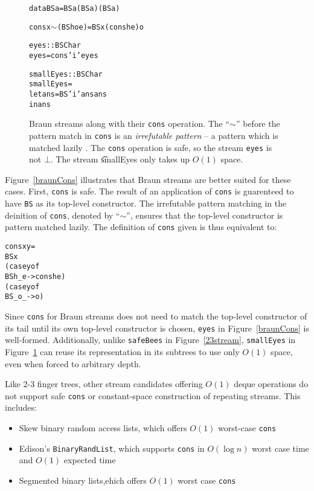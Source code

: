 \documentclass{llncs}
\begin{document}
\begin{figure}
\begin{alltt}
data BS a = BS a (BS a) (BS a)

cons x \(\sim\)(BS h o e) = BS x (cons h e) o

eyes :: BS Char
eyes = cons 'i' eyes

smallEyes :: BS Char
smallEyes = 
  let ans = BS 'i' ans ans 
  in ans
\end{alltt}
\caption{
Braun streams along with their {\tt cons} operation.
The ``$\sim$'' before the pattern match in {\tt cons} is an {\em irrefutable pattern} -- a pattern which is matched lazily \cite{haskellReport}.
The {\tt cons} operation is safe, so the stream {\tt eyes} is not $\bot$.
The stream {\t smallEyes} only takes up $O(1)$ space.
}
\label{braunCons}
\label{braunShare}
\end{figure}

Figure~\ref{braunCons} illustrates that Braun streams are better suited for these cases.
First, {\tt cons} is safe.
The result of an application of {\tt cons} is guarenteed to have {\tt BS} as its top-level constructor.
The irrefutable pattern matching in the deinition of {\tt cons}, denoted by ``$\sim$'', ensures that the top-level constructor is pattern matched lazily.
The definition of {\tt cons} given is thus equivalent to:

\begin{alltt}
cons x y =
  BS x
     (case y of
        BS h _ e -> cons h e)
     (case y of
        BS _ o _ -> o)
\end{alltt}

Since {\tt cons} for Braun streams does not need to match the top-level constructor of its tail until its own top-level constructor is chosen, {\tt eyes} in Figure~\ref{braunCons} is well-formed.
Additionally, unlike {\tt safeBees} in Figure~\ref{23stream}, {\tt smallEyes} in Figure~\ref{braunShare} can reuse its representation in its subtrees to use only $O(1)$ space, even when forced to arbitrary depth.

Like 2-3 finger trees, other stream candidates offering $O(1)$ deque operations do not support safe {\tt cons} or constant-space construction of repeating streams. This includes:

\begin{itemize}
\item Skew binary random access lists, which offers $O(1)$ worst-case {\tt cons} \cite{okasakiSkewLists}
\item Edison's \verb|BinaryRandList|, which supports {\tt cons} in $O(\log n)$ worst case time and $O(1)$ expected time \cite{holtersThesis}
\item Segmented binary lists,ehich offers $O(1)$ worst case {\tt cons} \cite{okasakiThesis}
\end{itemize}
\end{document}
